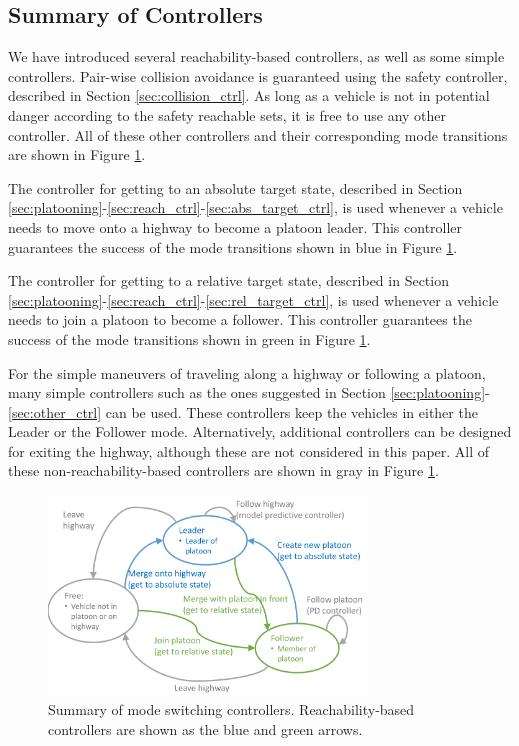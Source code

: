 \subsection{Summary of Controllers}
We have introduced several reachability-based controllers, as well as some simple controllers. Pair-wise collision avoidance is guaranteed using the safety controller, described in Section \ref{sec:collision_ctrl}. As long as a vehicle is not in potential danger according to the safety reachable sets, it is free to use any other controller. All of these other controllers and their corresponding mode transitions are shown in Figure \ref{fig:modeControllers}.

The controller for getting to an absolute target state, described in Section \ref{sec:platooning}-\ref{sec:reach_ctrl}-\ref{sec:abs_target_ctrl}, is used whenever a vehicle needs to move onto a highway to become a platoon leader. This controller guarantees the success of the mode transitions shown in blue in Figure \ref{fig:modeControllers}.

The controller for getting to a relative target state, described in Section \ref{sec:platooning}-\ref{sec:reach_ctrl}-\ref{sec:rel_target_ctrl}, is used whenever a vehicle needs to join a platoon to become a follower. This controller guarantees the success of the mode transitions shown in green in Figure \ref{fig:modeControllers}.

For the simple maneuvers of traveling along a highway or following a platoon, many simple controllers such as the ones suggested in Section \ref{sec:platooning}-\ref{sec:other_ctrl} can be used. These controllers keep the vehicles in either the Leader or the Follower mode. Alternatively, additional controllers can be designed for exiting the highway, although these are not considered in this paper. All of these non-reachability-based controllers are shown in gray in Figure \ref{fig:modeControllers}.

\begin{figure}
	\centering
	\includegraphics[width=0.75\textwidth]{"fig/modeControllers"}
	\caption{Summary of mode switching controllers. Reachability-based controllers are shown as the blue and green arrows.}
	\label{fig:modeControllers}
\end{figure}